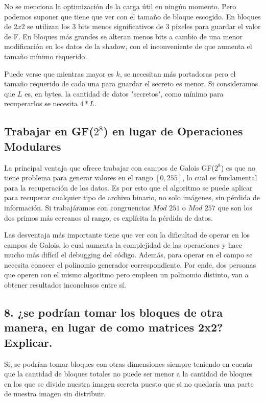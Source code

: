 \documentclass[11pt]{scrartcl} %
\begin{document}
No se menciona la optimización de la carga útil en ningún momento. Pero podemos suponer que tiene que ver con el tamaño de bloque escogido. En bloques de $2x2$ se utilizan los 3 bits menos significativos de 3 píxeles para guardar el valor de F. En bloques más grandes se alteran menos bits a cambio de una menor modificación en los datos de la shadow, con el inconveniente de que aumenta el tamaño mínimo requerido.  

Puede verse que mientras mayor es $k$, se necesitan más portadoras pero el tamaño requerido de cada una para guardar el secreto es menor. Si consideramos que $L$ es, en bytes, la cantidad de datos "secretos", como mínimo para recuperarlos se necesita $4*L$. 


\subsection{Trabajar en GF($2^{8}$) en lugar de Operaciones Modulares}

La principal ventaja que ofrece trabajar con campos de Galois GF($2^8$) es que no tiene problema para generar valores en el rango $[0,255]$, lo cual es fundamental para la recuperación de los datos. Es por esto que el algoritmo se puede aplicar para recuperar cualquier tipo de archivo binario, no solo imágenes, sin pérdida de información. Si trabajáramos con congruencias $Mod$ $251$ o $Mod$ $257$ que son los dos primos más cercanos al rango, es explícita la pérdida de datos.

Las desventaja más importante tiene que ver con la dificultad de operar en los campos de Galois, lo cual aumenta la complejidad de las operaciones y hace mucho más difícil el debugging del código. Además, para operar en el campo se necesita conocer el polinomio generador correspondiente. Por ende, dos personas que operen con el mismo algoritmo pero empleen un polinomio distinto, van a obtener resultados inconclusos entre sí.

\subsection{8. ¿se podrían tomar los bloques de otra manera, en lugar de como matrices 2x2? Explicar.}

Si, se podrían tomar bloques con otras dimensiones siempre teniendo en cuenta que la cantidad de bloques totales no puede ser menor a la cantidad de bloques en los que se divide nuestra imagen secreta puesto que si no quedaría una parte de nuestra imagen sin distribuir. 
\end{document}

